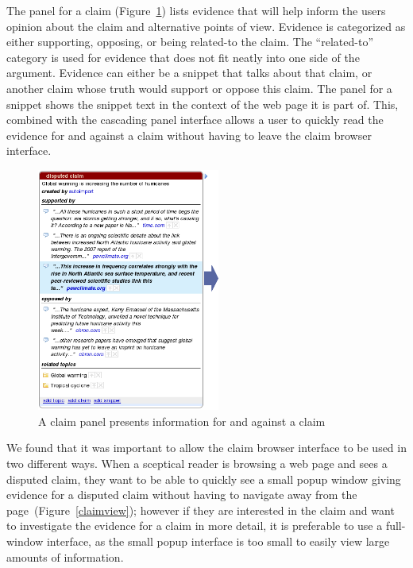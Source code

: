 \documentclass{chi2009}
\newcommand{\todo}[1]{}
\begin{document}
The panel for a claim (Figure~\ref{panel}) lists evidence that will help inform the users opinion about the claim and alternative points of view. Evidence is categorized as either supporting, opposing, or being related-to the claim. The ``related-to'' category is used for evidence that does not fit neatly into one side of the argument. Evidence can either be a snippet that talks about that claim, or another claim whose truth would support or oppose this claim.  The panel for a snippet shows the snippet text in the context of the web page it is part of. This, combined with the cascading panel interface allows a user to quickly read the evidence for and against a claim without having to leave the claim browser interface.

\todo{Remove ``related`` from the topics list - confuses with related claims}
\todo{Show the other panels?}

\begin{figure}[tb]
	\begin{center}
	\includegraphics[width=6cm]{../screenshots/v2_panel.png}
	\caption{A claim panel presents information for and against a claim}
	\label{panel}
	\end{center}
\end{figure}

We found that it was important to allow the claim browser interface to be used in two different ways. When a sceptical reader is browsing a web page and sees a disputed claim, they want to be able to quickly see a small popup window giving evidence for a disputed claim without having to navigate away from the page~(Figure~\ref{claimview}); however if they are interested in the claim and want to investigate the evidence for a claim in more detail, it is preferable to use a full-window interface, as the small popup interface is too small to easily view large amounts of information.
\end{document}
